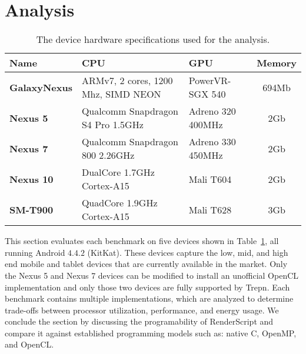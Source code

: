 \section{Analysis}
\label{sec:analysis}


\begin{table}
\centering
\begin{tabular}{ | l | p{2.1cm} | p{1.7cm} | c |}
    \hline 
    Name & CPU & GPU & Memory \\ \hline
    \textbf{GalaxyNexus} & ARMv7, 2 cores, 1200 Mhz, SIMD NEON & PowerVR-SGX 540 & 694Mb \\ \hline
    \textbf{Nexus 5} & Qualcomm Snapdragon S4 Pro 1.5GHz & Adreno 320 400MHz & 2Gb \\ \hline
    \textbf{Nexus 7} & Qualcomm Snapdragon 800 2.26GHz & Adreno 330 450MHz & 2Gb \\ \hline
    \textbf{Nexus 10} & DualCore 1.7GHz Cortex-A15 & Mali T604 & 2Gb \\ \hline
    \textbf{SM-T900} & QuadCore 1.9GHz Cortex-A15 & Mali T628 & 3Gb \\ \hline
    \hline
\end{tabular}
\caption{The device hardware specifications used for the analysis.}
\label{table:hardware}
\end{table}

This section evaluates each benchmark on five devices shown
  in Table~\ref{table:hardware}, all running Android $4.4.2$ (KitKat).
These devices capture the low, mid, and high end mobile and tablet
  devices that are currently available in the market.
Only the Nexus 5 and Nexus 7 devices can be modified to install an
  unofficial OpenCL implementation and only those two devices are fully supported
  by Trepn.
Each benchmark contains multiple implementations, which 
  are analyzed to determine trade-offs between
  processor utilization, performance, and energy usage.
We conclude the section by discussing the programability of RenderScript
  and compare it against established programming models such as:
  native C, OpenMP, and OpenCL.







